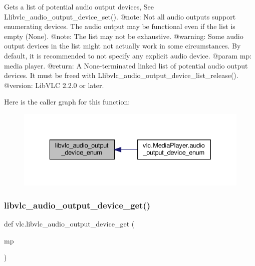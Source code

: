 \begin{DoxyVerb}Gets a list of potential audio output devices,
See L{libvlc_audio_output_device_set}().
@note: Not all audio outputs support enumerating devices.
The audio output may be functional even if the list is empty (None).
@note: The list may not be exhaustive.
@warning: Some audio output devices in the list might not actually work in
some circumstances. By default, it is recommended to not specify any
explicit audio device.
@param mp: media player.
@return: A None-terminated linked list of potential audio output devices. It must be freed with L{libvlc_audio_output_device_list_release}().
@version: LibVLC 2.2.0 or later.
\end{DoxyVerb}
 Here is the caller graph for this function\+:
\nopagebreak
\begin{figure}[H]
\begin{center}
\leavevmode
\includegraphics[width=329pt]{namespacevlc_ad0eaa466313964c4c8f8fca0cdb4dc03_icgraph}
\end{center}
\end{figure}
\mbox{\label{namespacevlc_a5b5babcb373f2af5cfa81ff75f932192}} 
\subsubsection{\texorpdfstring{libvlc\+\_\+audio\+\_\+output\+\_\+device\+\_\+get()}{libvlc\_audio\_output\_device\_get()}}
{\footnotesize\ttfamily def vlc.\+libvlc\+\_\+audio\+\_\+output\+\_\+device\+\_\+get (\begin{DoxyParamCaption}\item[{}]{mp }\end{DoxyParamCaption})}

